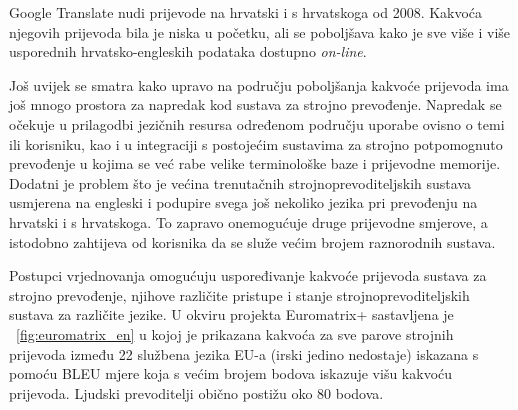 \begin{multicols}{2}
Google Translate nudi prijevode na hrvatski i s hrvatskoga od 2008. Kakvoća njegovih prijevoda bila je niska u početku, ali se poboljšava kako je sve više i više usporednih hrvatsko-engleskih podataka dostupno \emph{on-line}.

Još uvijek se smatra kako upravo na području poboljšanja kakvoće prijevoda ima još mnogo prostora za napredak kod sustava za strojno prevođenje. Napredak se očekuje u prilagodbi jezičnih resursa određenom području uporabe ovisno o temi ili korisniku, kao i u integraciji s postojećim sustavima za strojno potpomognuto prevođenje u kojima se već rabe velike terminološke baze i prijevodne memorije. Dodatni je problem što je većina trenutačnih strojnoprevoditeljskih sustava usmjerena na engleski i podupire svega još nekoliko jezika pri prevođenju na hrvatski i s hrvatskoga. To zapravo onemogućuje druge prijevodne smjerove, a istodobno zahtijeva od korisnika da se služe većim brojem raznorodnih sustava.

Postupci vrjednovanja omogućuju uspoređivanje kakvoće prijevoda sustava za strojno prevođenje, njihove različite pristupe i stanje strojnoprevoditeljskih sustava za različite jezike. U okviru projekta Euromatrix+ sastavljena je ~\ref{fig:euromatrix_en} u kojoj je prikazana kakvoća za sve parove strojnih prijevoda između 22 službena jezika EU-a (irski jedino nedostaje) iskazana s pomoću BLEU mjere \cite{pro6} koja s većim brojem bodova iskazuje višu kakvoću prijevoda. Ljudski prevoditelji obično postižu oko 80 bodova. 


\end{multicols}
